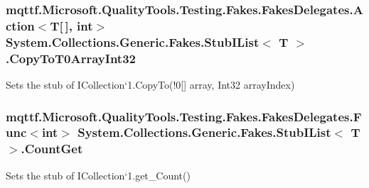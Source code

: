 \hypertarget{class_system_1_1_collections_1_1_generic_1_1_fakes_1_1_stub_i_list_3_01_t_01_4_ad761aa13f54592afe6891789bda5d2ba}{
\subsubsection[{Copy\-To\-T0\-Array\-Int32}]{\setlength{\rightskip}{0pt plus 5cm}mqttf.\-Microsoft.\-Quality\-Tools.\-Testing.\-Fakes.\-Fakes\-Delegates.\-Action$<$T\mbox{[}$\,$\mbox{]}, int$>$ System.\-Collections.\-Generic.\-Fakes.\-Stub\-I\-List$<$ T $>$.Copy\-To\-T0\-Array\-Int32}}\label{class_system_1_1_collections_1_1_generic_1_1_fakes_1_1_stub_i_list_3_01_t_01_4_ad761aa13f54592afe6891789bda5d2ba}


Sets the stub of I\-Collection`1.Copy\-To(!0\mbox{[}\mbox{]} array, Int32 array\-Index)

\hypertarget{class_system_1_1_collections_1_1_generic_1_1_fakes_1_1_stub_i_list_3_01_t_01_4_a2b08dfd442f20beda2b007876996ffc4}{
\subsubsection[{Count\-Get}]{\setlength{\rightskip}{0pt plus 5cm}mqttf.\-Microsoft.\-Quality\-Tools.\-Testing.\-Fakes.\-Fakes\-Delegates.\-Func$<$int$>$ System.\-Collections.\-Generic.\-Fakes.\-Stub\-I\-List$<$ T $>$.Count\-Get}}\label{class_system_1_1_collections_1_1_generic_1_1_fakes_1_1_stub_i_list_3_01_t_01_4_a2b08dfd442f20beda2b007876996ffc4}


Sets the stub of I\-Collection`1.get\-\_\-\-Count()

